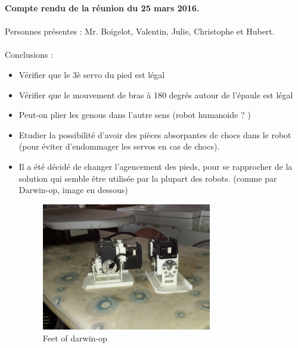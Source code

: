\documentclass[10pt,a4paper]{article}
\begin{document}
\textbf{Compte rendu de la réunion du 25 mars 2016.}\\\\
Personnes présentes : Mr. Boigelot, Valentin, Julie, Christophe et Hubert.\\\\
Conclusions :
\begin{itemize}
\item Vérifier que le 3è servo du pied est légal
\item Vérifier que le mouvement de bras à 180 degrés autour de l'épaule est légal
\item Peut-on plier les genous dans l'autre sens (robot humanoide ? )
\item Etudier la possibilité d'avoir des pièces absorpantes de chocs dans le robot (pour éviter d'endommager les servos en cas de chocs).
\item Il a été décidé de changer l'agencement des pieds, pour se rapprocher de la solution qui semble être utilisée par la plupart des robots. (comme par Darwin-op, image en dessous)
\begin{figure}[htp]
\center
\includegraphics[width=0.7\textwidth]{feet}
\caption{Feet of darwin-op}
\label{feet}
\end{figure}
\end{itemize}
\end{document}
